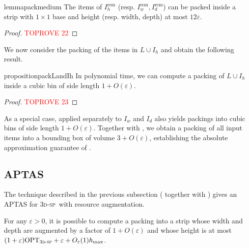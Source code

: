 \documentclass[a4paper,UKenglish,cleveref, autoref, thm-restate]{lipics-v2021}
\newcommand{\opt}{\mathrm{OPT}}
\newcommand{\tsp}{\textsc{3d-sp}\xspace}
\begin{document}
\begin{restatable}{lemma}{packmedium}
\label{lem:packmedium}
    The items of $I^{\text{rem}}_h$ (resp. $I^{\text{rem}}_w,I^{\text{rem}}_d$) can be packed inside a strip with $1\times 1$ base and height (resp. width, depth) at most $12\varepsilon$.
\end{restatable}
\begin{proof}\textcolor{red}{TOPROVE 22}\end{proof}

We now consider the packing of the items in $L\cup I_h$ and obtain the following result.
\begin{restatable}{proposition}{packLandIh}
\label{pro:packLandIh}
    In polynomial time, we can compute a packing of $L\cup I_h$ inside a cubic bin of side length $1+O(\varepsilon)$.
\end{restatable}




\begin{proof}\textcolor{red}{TOPROVE 23}\end{proof}

As a special case,  applied separately to $I_w$ and $I_d$ also yields packings into cubic bins of side length $1+O(\varepsilon)$. Together with , we obtain a packing of all input items into a bounding box of volume $3+O(\varepsilon)$, establishing the absolute approximation guarantee of .







\subsection{APTAS}
The technique described in the previous subsection ( together with \cite{3d-strip-packing}) gives an APTAS for \tsp~with resource augmentation.

\begin{lemma}
    For any $\varepsilon>0$, it is possible to compute a packing into a strip whose width and depth are augmented by a factor of $1+O(\varepsilon)$ and whose height is at most $(1+\varepsilon)\opt_{\tsp}+\varepsilon+O_{\varepsilon}(1)h_{\max}$.
\end{lemma}
\end{document}
